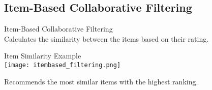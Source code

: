 \subsection{Item-Based Collaborative Filtering}

\begin{concept}{Item-Based Collaborative Filtering}\\
Calculates the similarity between the items based on their rating.
\end{concept}

\begin{example2}{Item Similarity Example}\\
\texttt{[image: itembased\_filtering.png]}

Recommends the most similar items with the highest ranking.
\end{example2}
